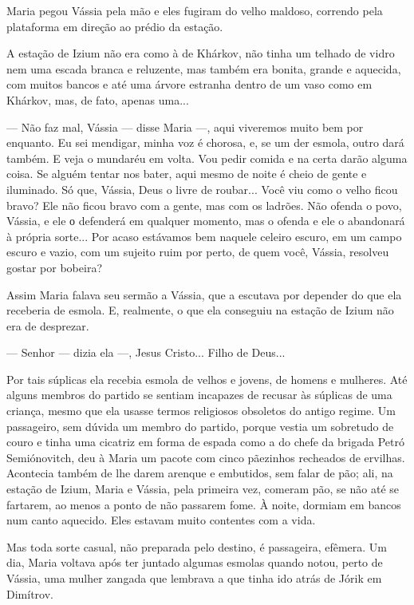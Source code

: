 Maria pegou Vássia pela mão e eles fugiram do velho maldoso, correndo
pela plataforma em direção ao prédio da estação.

A estação de Izium não era como à de Khárkov, não tinha um telhado de
vidro nem uma escada branca e reluzente, mas também era bonita, grande e
aquecida, com muitos bancos e até uma árvore estranha dentro de um vaso
como em Khárkov, mas, de fato, apenas uma...

--- Não faz mal, Vássia --- disse Maria ---, aqui viveremos muito bem
por enquanto. Eu sei mendigar, minha voz é chorosa, e, se um der esmola,
outro dará também. E veja o mundaréu em volta. Vou pedir comida e na
certa darão alguma coisa. Se alguém tentar nos bater, aqui mesmo de
noite é cheio de gente e iluminado. Só que, Vássia, Deus o livre de
roubar... Você viu como o velho ficou bravo? Ele não ficou bravo com a
gente, mas com os ladrões. Não ofenda o povo, Vássia, e ele о defenderá
em qualquer momento, mas o ofenda e ele o abandonará à própria sorte...
Por acaso estávamos bem naquele celeiro escuro, em um campo escuro e
vazio, com um sujeito ruim por perto, de quem você, Vássia, resolveu
gostar por bobeira?

Assim Maria falava seu sermão a Vássia, que a escutava por depender do
que ela receberia de esmola. E, realmente, o que ela conseguiu na
estação de Izium não era de desprezar.

--- Senhor --- dizia ela ---, Jesus Cristo... Filho de Deus...

Por tais súplicas ela recebia esmola de velhos e jovens, de homens e
mulheres. Até alguns membros do partido se sentiam incapazes de recusar
às súplicas de uma criança, mesmo que ela usasse termos religiosos
obsoletos do antigo regime. Um passageiro, sem dúvida um membro do
partido, porque vestia um sobretudo de couro e tinha uma cicatriz em
forma de espada como a do chefe da brigada Petró Semiónovitch, deu à
Maria um pacote com cinco pãezinhos recheados de ervilhas. Acontecia
também de lhe darem arenque e embutidos, sem falar de pão; ali, na
estação de Izium, Maria e Vássia, pela primeira vez, comeram pão, se não
até se fartarem, ao menos a ponto de não passarem fome. À noite, dormiam
em bancos num canto aquecido. Eles estavam muito contentes com a vida.

Mas toda sorte casual, não preparada pelo destino, é passageira,
efêmera. Um dia, Maria voltava após ter juntado algumas esmolas quando
notou, perto de Vássia, uma mulher zangada que lembrava a que tinha ido
atrás de Jórik em Dimítrov.

